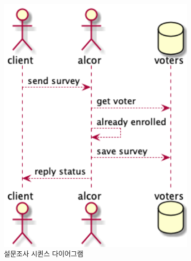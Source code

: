 \documentclass[10pt,a4paper,left=15mm,right=15mm,top=20mm,bottom=20mm]{article}
\begin{document}
    \begin{figure}[h]
        \begin{center}
            \includegraphics[width=10cm]{survey-seq}
            \caption{설문조사 시퀸스 다이어그램}
        \end{center}
    \end{figure}
\end{document}
